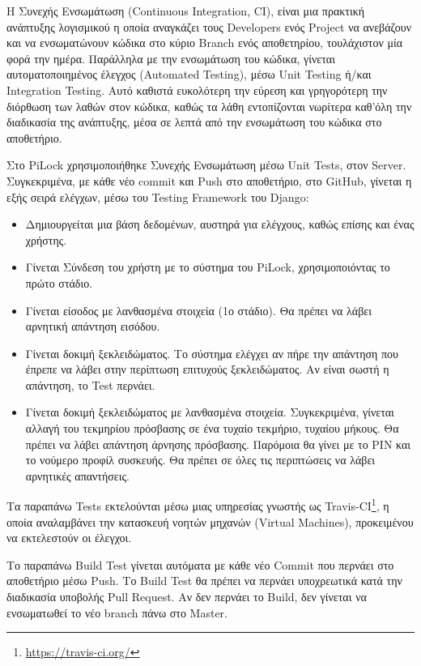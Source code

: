 Η Συνεχής Ενσωμάτωση (Continuous Integration, CI), είναι μια πρακτική ανάπτυξης λογισμικού η οποία αναγκάζει τους Developers ενός Project να ανεβάζουν και να ενσωματώνουν κώδικα στο κύριο Branch ενός αποθετηρίου, τουλάχιστον μία φορά την ημέρα. Παράλληλα με την ενσωμάτωση του κώδικα, γίνεται αυτοματοποιημένος έλεγχος (Automated Testing), μέσω Unit Testing ή/και Integration Testing. Αυτό καθιστά ευκολότερη την εύρεση και γρηγορότερη την διόρθωση των λαθών στον κώδικα, καθώς τα λάθη εντοπίζονται νωρίτερα καθ'όλη την διαδικασία της ανάπτυξης, μέσα σε λεπτά από την ενσωμάτωση του κώδικα στο αποθετήριο.

Στο PiLock χρησιμοποιήθηκε Συνεχής Ενσωμάτωση μέσω Unit Tests, στον Server. Συγκεκριμένα, με κάθε νέο commit και Push στο αποθετήριο, στο GitHub, γίνεται η εξής σειρά ελέγχων, μέσω του Testing Framework του Django:

\begin{itemize}
	\item Δημιουργείται μια βάση δεδομένων, αυστηρά για ελέγχους, καθώς επίσης και ένας χρήστης.
	\item Γίνεται Σύνδεση του χρήστη με το σύστημα του PiLock, χρησιμοποιόντας το πρώτο στάδιο.
	\item Γίνεται είσοδος με λανθασμένα στοιχεία (1ο στάδιο). Θα πρέπει να λάβει αρνητική απάντηση εισόδου.
	\item Γίνεται δοκιμή ξεκλειδώματος. Το σύστημα ελέγχει αν πήρε την απάντηση που έπρεπε να λάβει στην περίπτωση επιτυχούς ξεκλειδώματος. Αν είναι σωστή η απάντηση, το Test περνάει.
	\item Γίνεται δοκιμή ξεκλειδώματος με λανθασμένα στοιχεία. Συγκεκριμένα, γίνεται αλλαγή του τεκμηρίου πρόσβασης σε ένα τυχαίο τεκμήριο, τυχαίου μήκους. Θα πρέπει να λάβει απάντηση άρνησης πρόσβασης. Παρόμοια θα γίνει με το PIN και το νούμερο προφίλ συσκευής. Θα πρέπει σε όλες τις περιπτώσεις να λάβει αρνητικές απαντήσεις.
\end{itemize}

Τα παραπάνω Tests εκτελούνται μέσω μιας υπηρεσίας γνωστής ως Travis-CI\footnote{\url{https://travis-ci.org/}}, η οποία αναλαμβάνει την κατασκευή νοητών μηχανών (Virtual Machines), προκειμένου να εκτελεστούν οι έλεγχοι.

Το παραπάνω Build Test γίνεται αυτόματα με κάθε νέο Commit που περνάει στο αποθετήριο μέσω Push. Το Build Test θα πρέπει να περνάει υποχρεωτικά κατά την διαδικασία υποβολής Pull Request. Αν δεν περνάει το Build, δεν γίνεται να ενσωματωθεί το νέο branch πάνω στο Master.